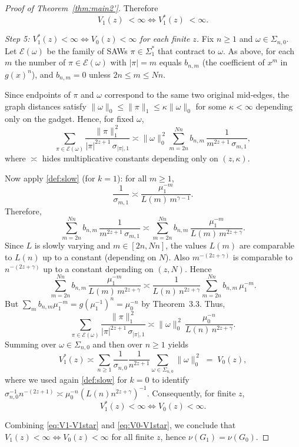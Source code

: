 \documentclass[12pt]{amsart}
\theoremstyle{plain}
\numberwithin{equation}{section}
\numberwithin{theorem}{section}
\numberwithin{figure}{section}
\begin{document}
\begin{proof}[Proof of Theorem~\ref{thm:main2'}]
Therefore \begin{equation}\label{eq:V1-V1star} V_1(z)\;<\infty \iff V_1^\ast(z)\;<\infty .
\end{equation}


\smallskip\noindent
\emph{Step 5: $V_1^\ast(z)<\infty \iff V_0(z)<\infty$ for each finite $z$.}
Fix $n\ge 1$ and $\omega\in\Sigma_{n,0}$.  Let $\mathcal{E}(\omega)$ be the family of SAWs
$\pi\in\Sigma_1^\ast$ that contract to $\omega$.  As above, for each $m$ the number of $\pi\in\mathcal{E}(\omega)$
with $|\pi|=m$ equals $b_{n,m}$ (the coefficient of $x^m$ in $g(x)^n$), and $b_{n,m}=0$ unless $2n\le m\le Nn$.

Since endpoints of $\pi$ and $\omega$ correspond to the same two original mid-edges, the graph distances satisfy
$\|\omega\|_0 \le \|\pi\|_1 \le \kappa \|\omega\|_0$ for some $\kappa<\infty$ depending only on the gadget.
Hence, for fixed $\omega$,
\[
\sum_{\pi\in\mathcal{E}(\omega)} \frac{\|\pi\|_1^{\,2}}{|\pi|^{2z+1}\,\sigma_{|\pi|,1}}
\asymp
\|\omega\|_0^{\,2}\sum_{m=2n}^{Nn} b_{n,m}\,\frac{1}{m^{2z+1}\,\sigma_{m,1}},
\]
where $\asymp$ hides multiplicative constants depending only on $(z,\kappa)$.

Now apply \eqref{def:slow} (for $k=1$): for all $m\ge 1$,
\[
\frac{1}{\sigma_{m,1}}
\asymp
\frac{\mu_1^{-m}}{L(m)\,m^{\gamma-1}}.
\]
Therefore,
\[
\sum_{m=2n}^{Nn} b_{n,m}\,\frac{1}{m^{2z+1}\,\sigma_{m,1}}
\asymp
\sum_{m=2n}^{Nn} b_{n,m}\,\frac{\mu_1^{-m}}{L(m)\,m^{2z+\gamma}}.
\]
Since $L$ is slowly varying and $m\in[2n,Nn]$, the values $L(m)$ are comparable to $L(n)$ up to a constant
(depending on $N$).  Also $m^{-(2z+\gamma)}$ is comparable to $n^{-(2z+\gamma)}$ up to a constant depending
on $(z,N)$.  Hence
\[
\sum_{m=2n}^{Nn} b_{n,m}\,\frac{\mu_1^{-m}}{L(m)\,m^{2z+\gamma}}
\asymp
\frac{1}{L(n)\,n^{2z+\gamma}}\sum_{m=2n}^{Nn} b_{n,m}\,\mu_1^{-m}.
\]
But $\sum_m b_{n,m}\mu_1^{-m}=g(\mu_1^{-1})^n=\mu_0^{-n}$ by Theorem~3.3.
Thus,
\[
\sum_{\pi\in\mathcal{E}(\omega)} \frac{\|\pi\|_1^{\,2}}{|\pi|^{2z+1}\,\sigma_{|\pi|,1}}
\asymp
\|\omega\|_0^{\,2}\,\frac{\mu_0^{-n}}{L(n)\,n^{2z+\gamma}}.
\]
Summing over $\omega\in\Sigma_{n,0}$ and then over $n\ge 1$ yields
\[
V_1^\ast(z)\asymp \sum_{n\ge 1}\frac{1}{\sigma_{n,0}}\frac{1}{n^{2z+1}}\sum_{\omega\in\Sigma_{n,0}}\|\omega\|_0^{\,2}
\;=\;V_0(z),
\]
where we used again \eqref{def:slow} for $k=0$ to identify
$\sigma_{n,0}^{-1}n^{-(2z+1)}\asymp \mu_0^{-n}(L(n)n^{2z+\gamma})^{-1}$.
Consequently, for finite $z$,
\begin{equation}\label{eq:V0-V1star}
V_1^\ast(z)<\infty \iff V_0(z)<\infty .
\end{equation}

Combining \eqref{eq:V1-V1star} and \eqref{eq:V0-V1star}, we conclude that
$V_1(z)<\infty \iff V_0(z)<\infty$ for all finite $z$, hence $\nu(G_1)=\nu(G_0)$.
\end{proof}
\end{document}
